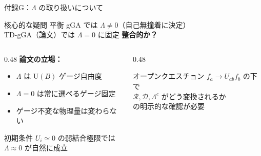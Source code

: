 \documentclass[12pt,aspectratio=169]{beamer}
\begin{document}
\begin{frame}{付録G：$\Lambda$ の取り扱いについて}
  \begin{alertblock}{核心的な疑問}
    平衡 gGA では $\Lambda\neq0$（自己無撞着に決定）\\
    TD-gGA（論文）では $\Lambda=0$ に固定 \quad \textbf{整合的か？}
  \end{alertblock}

  \smallskip
  \begin{columns}[T]
    \begin{column}{0.48\textwidth}
      \textbf{論文の立場：}
      \begin{itemize}
        \item $\Lambda$ は $\mathrm{U}(B)$ ゲージ自由度
        \item $\Lambda=0$ は常に選べるゲージ固定
        \item ゲージ不変な物理量は変わらない
      \end{itemize}
      \begin{block}{\small 初期条件}
        \small $U_i\simeq0$ の弱結合極限では\\
        $\Lambda\approx0$ が自然に成立
      \end{block}
    \end{column}

    \begin{column}{0.48\textwidth}
      \begin{alertblock}{\small オープンクエスチョン}
        \small $f_a\to U_{ab}f_b$ の下で\\
        $\mathcal{R},\mathcal{D},\Lambda^c$ がどう変換されるか\\
        の明示的な確認が必要
      \end{alertblock}
    \end{column}
  \end{columns}
\end{frame}
\end{document}
